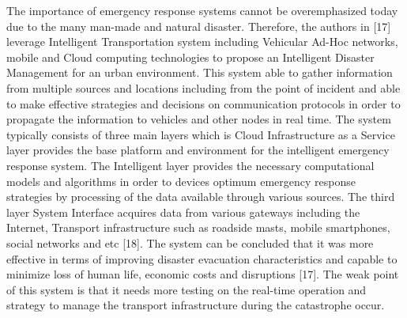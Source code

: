 \documentclass{article}
\begin{document}
The importance of emergency response systems cannot be overemphasized today due to the many man-made and natural disaster. Therefore, the authors in [17] leverage Intelligent Transportation system including Vehicular Ad-Hoc networks, mobile and Cloud computing technologies to propose an Intelligent Disaster Management for an urban environment. This system able to gather information from multiple sources and locations including from the point of incident and able to make effective strategies and decisions on communication protocols in order to propagate the information to vehicles and other nodes in real time. The system typically consists of three main layers which is Cloud Infrastructure as a Service layer provides the base platform and environment for the intelligent emergency response system. The Intelligent layer provides the necessary computational models and algorithms in order to devices optimum emergency response strategies by processing of the data available through various sources. The third layer System Interface acquires data from various gateways including the Internet, Transport infrastructure such as roadside masts, mobile smartphones, social networks and etc [18]. The system can be concluded that it was more effective in terms of improving disaster evacuation characteristics and capable to minimize loss of human life, economic costs and disruptions [17]. The weak point of this system is that it needs more testing on the real-time operation and strategy to manage the transport infrastructure during the catastrophe occur.    
\end{document}
